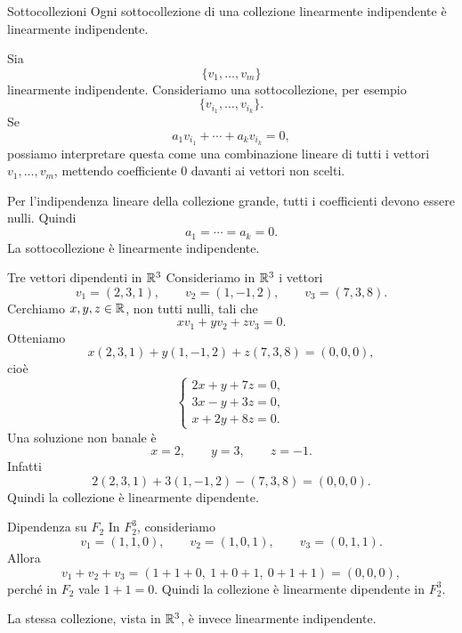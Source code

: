 \documentclass[a4paper]{article}
\begin{document}
\begin{snippetproposition}{Sottocollezioni}
    Ogni sottocollezione di una collezione linearmente indipendente è linearmente indipendente.
\end{snippetproposition}

\begin{snippetproof}{}
    Sia
    \[
        \{v_1,\ldots,v_m\}
    \]
    linearmente indipendente. Consideriamo una sottocollezione, per esempio
    \[
        \{v_{i_1},\ldots,v_{i_k}\}.
    \]
    Se
    \[
        a_1v_{i_1}+\cdots+a_kv_{i_k}=0,
    \]
    possiamo interpretare questa come una combinazione lineare di tutti i vettori \(v_1,\ldots,v_m\), mettendo coefficiente \(0\) davanti ai vettori non scelti.

    Per l'indipendenza lineare della collezione grande, tutti i coefficienti devono essere nulli. Quindi
    \[
        a_1=\cdots=a_k=0.
    \]
    La sottocollezione è linearmente indipendente.
\end{snippetproof}

\begin{snippetexample}{Tre vettori dipendenti in \(\mathbb{R}^3\)}
    Consideriamo in \(\mathbb{R}^3\) i vettori
    \[
        v_1=(2,3,1),
        \qquad
        v_2=(1,-1,2),
        \qquad
        v_3=(7,3,8).
    \]
    Cerchiamo \(x,y,z\in\mathbb{R}\), non tutti nulli, tali che
    \[
        xv_1+yv_2+zv_3=0.
    \]
    Otteniamo
    \[
        x(2,3,1)+y(1,-1,2)+z(7,3,8)=(0,0,0),
    \]
    cioè
    \[
        \begin{cases}
            2x+y+7z=0,\\
            3x-y+3z=0,\\
            x+2y+8z=0.
        \end{cases}
    \]
    Una soluzione non banale è
    \[
        x=2,
        \qquad
        y=3,
        \qquad
        z=-1.
    \]
    Infatti
    \[
        2(2,3,1)+3(1,-1,2)-(7,3,8)=(0,0,0).
    \]
    Quindi la collezione è linearmente dipendente.
\end{snippetexample}

\begin{snippetexample}{Dipendenza su \(F_2\)}
    In \(F_2^3\), consideriamo
    \[
        v_1=(1,1,0),
        \qquad
        v_2=(1,0,1),
        \qquad
        v_3=(0,1,1).
    \]
    Allora
    \[
        v_1+v_2+v_3
        =
        (1+1+0,\ 1+0+1,\ 0+1+1)
        =
        (0,0,0),
    \]
    perché in \(F_2\) vale \(1+1=0\). Quindi la collezione è linearmente dipendente in \(F_2^3\).

    La stessa collezione, vista in \(\mathbb{R}^3\), è invece linearmente indipendente.
\end{snippetexample}
\end{document}
